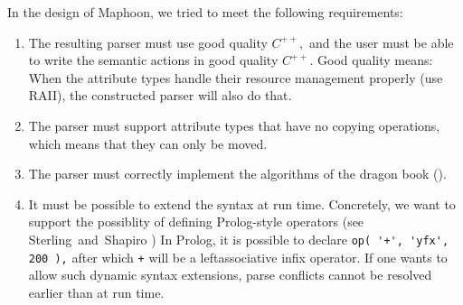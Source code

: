 \documentclass{article}
\begin{document}
\noindent
In the design of Maphoon, we tried to meet the following requirements:
\begin{enumerate}
\item
   The resulting parser must use good quality $ C^{++}, $ 
   and the user must be able to write the semantic actions 
   in good quality $ C^{++}. $ Good quality means: 
   When the attribute types handle their resource management 
   properly (use RAII), the constructed parser will also do that. 

\item
   The parser must support attribute types that have
   no copying operations, which means that they can only be moved.

\item
   The parser must correctly implement the algorithms of the 
   dragon book (\cite{Dragon2007}).

\item
   It must be possible to extend the syntax at run time. Concretely,
   we want to support the possiblity of defining Prolog-style operators 
   (see Sterling~and~Shapiro \cite{SterlingShapiro94})
   In Prolog, it is possible to declare \verb&op( '+', 'yfx', 200 ),& 
   after which \verb|+| will be a leftassociative infix operator.
   If one wants to allow such dynamic syntax extensions, parse 
   conflicts cannot be resolved earlier than at run time. 
   

\end{enumerate}
\end{document}
